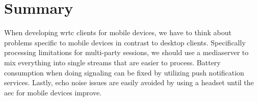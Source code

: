 \section{Summary}
When developing \gls{wrtc} clients for mobile devices, we have to think about problems specific to mobile devices in contrast to desktop clients. Specifically processing limitations for multi-party sessions, we should use a mediaserver to mix everything into single streams that are easier to process. Battery consumption when doing signaling can be fixed by utilizing push notification services. Lastly, echo noise issues are easily avoided by using a headset until the \gls{aec} for mobile devices improve.